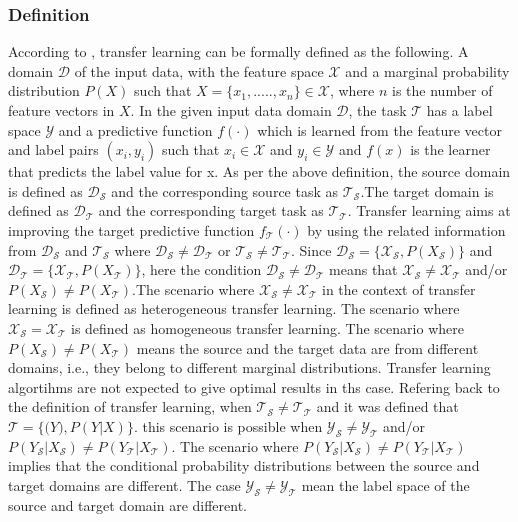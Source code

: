 \subsubsection{Definition}
According to \cite*{weiss2016survey,pan2009survey}, transfer learning can be formally defined as the following. A domain $\mathcal{D}$ of the input data, with the feature space $\mathcal{X}$ and a marginal probability distribution $P(X)$ such that $X=\{x_{1},.....,x_{n}\} \in \mathcal{X}$, where $n$ is the number of feature vectors in $X$. In the given input data domain $\mathcal{D}$, the task $\mathcal{T}$ has a label space $\mathcal{Y}$ and a predictive function $f(\cdot)$ which is learned from the feature vector and label pairs $(x_{i},y_{i})$ such that $x_{i} \in \mathcal{X}$ and $y_{i} \in \mathcal{Y}$ and $f(x)$ is the learner that predicts the label value for x. As per the above definition, the source domain is defined as $\mathcal{D_{\mathcal{S}}}$ and the corresponding source task as $\mathcal{T_{\mathcal{S}}}$.The target domain is defined as $\mathcal{D_{\mathcal{T}}}$ and the corresponding target task as $\mathcal{T_{\mathcal{T}}}$. Transfer learning aims at improving the target predictive function $f_{\mathcal{T}}(\cdot)$ by using the related information from $\mathcal{D_{\mathcal{S}}}$ and $\mathcal{T_{\mathcal{S}}}$ where $\mathcal{D_{\mathcal{S}}}\neq \mathcal{D_{\mathcal{T}}}$ or $\mathcal{T_{\mathcal{S}}}\neq \mathcal{T_{\mathcal{T}}}$. Since $\mathcal{D_{\mathcal{S}}} = \{\mathcal{X_{\mathcal{S}}},P(X_{\mathcal{S}})\}$ and $\mathcal{D_{\mathcal{T}}} = \{\mathcal{X_{\mathcal{T}}},P(X_{\mathcal{T}})\}$, here the condition $\mathcal{D_{\mathcal{S}}}\neq \mathcal{D_{\mathcal{T}}}$ means that $\mathcal{X_{\mathcal{S}}}\neq \mathcal{X_{\mathcal{T}}}$ and/or $P(X_{\mathcal{S}}) \neq P(X_{\mathcal{T}})$.The scenario where $\mathcal{X_{\mathcal{S}}}\neq \mathcal{X_{\mathcal{T}}}$ in the context of transfer learning is defined as heterogeneous transfer learning. The scenario where $\mathcal{X_{\mathcal{S}}} = \mathcal{X_{\mathcal{T}}}$ is defined as homogeneous transfer learning. The scenario where $P(X_{\mathcal{S}}) \neq P(X_{\mathcal{T}})$ means the source and the target data are from different domains, i.e., they belong to different marginal distributions. Transfer learning algortihms are not expected to give optimal results in ths case. Refering back to the definition of transfer learning, when $\mathcal{T_{\mathcal{S}}}\neq \mathcal{T_{\mathcal{T}}}$ and it was defined that $\mathcal{T} = \{\mathcal(Y),P(Y|X)\}$. this scenario is possible when $\mathcal{Y_{\mathcal{S}}} \neq \mathcal{Y_{\mathcal{T}}}$ and/or $P(Y_{\mathcal{S}}|X_{\mathcal{S}}) \neq P(Y_{\mathcal{T}}|X_{\mathcal{T}})$. The scenario where $P(Y_{\mathcal{S}}|X_{\mathcal{S}}) \neq P(Y_{\mathcal{T}}|X_{\mathcal{T}})$ implies that the conditional probability distributions between the source and target domains are different. The case $\mathcal{Y_{\mathcal{S}}} \neq \mathcal{Y_{\mathcal{T}}}$ mean the label space of the source and target domain are different.\cite*{weiss2016survey}
